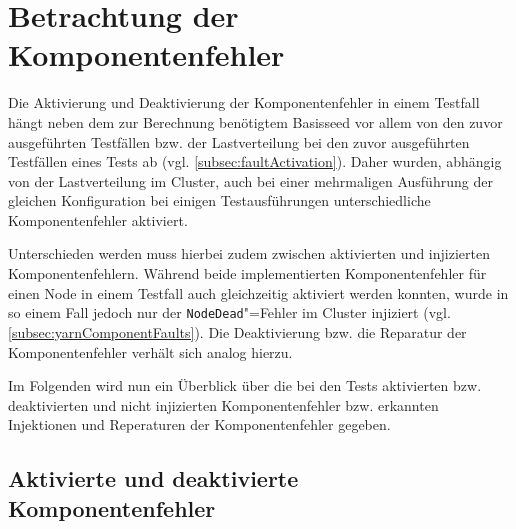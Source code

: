 \section{Betrachtung der Komponentenfehler}
\label{sec:faultEval}

Die Aktivierung und Deaktivierung der Komponentenfehler in einem Testfall hängt neben dem zur Berechnung benötigtem Basisseed vor allem von den zuvor ausgeführten Testfällen bzw. der Lastverteilung bei den zuvor ausgeführten Testfällen eines Tests ab (vgl. \cref{subsec:faultActivation}).
Daher wurden, abhängig von der Lastverteilung im Cluster, auch bei einer mehrmaligen Ausführung der gleichen Konfiguration bei einigen Testausführungen unterschiedliche Komponentenfehler aktiviert.

Unterschieden werden muss hierbei zudem zwischen aktivierten und injizierten Komponentenfehlern.
Während beide implementierten Komponentenfehler für einen Node in einem Testfall auch gleichzeitig aktiviert werden konnten, wurde in so einem Fall jedoch nur der \texttt{NodeDead}"=Fehler im Cluster injiziert (vgl. \cref{subsec:yarnComponentFaults}).
Die Deaktivierung bzw. die Reparatur der Komponentenfehler verhält sich analog hierzu.

Im Folgenden wird nun ein Überblick über die bei den Tests aktivierten bzw. deaktivierten und nicht injizierten Komponentenfehler bzw. erkannten Injektionen und Reperaturen der Komponentenfehler gegeben.

\subsection{Aktivierte und deaktivierte Komponentenfehler}
\label{subsec:actDeactFaults}

